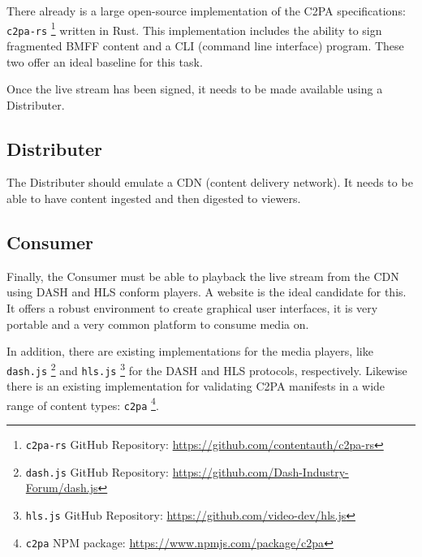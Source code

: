 There already is a large open-source implementation of the C2PA specifications: \texttt{c2pa-rs} \footnote{\texttt{c2pa-rs} GitHub Repository: \url{https://github.com/contentauth/c2pa-rs}} written in Rust. This implementation includes the ability to sign fragmented BMFF content and a CLI (command line interface) program. These two offer an ideal baseline for this task.

Once the live stream has been signed, it needs to be made available using a Distributer.

\subsection{Distributer}

The Distributer should emulate a CDN (content delivery network). It needs to be able to have content ingested and then digested to viewers.

\subsection{Consumer}

Finally, the Consumer must be able to playback the live stream from the CDN using DASH and HLS conform players. A website is the ideal candidate for this. It offers a robust environment to create graphical user interfaces, it is very portable and a very common platform to consume media on.

In addition, there are existing implementations for the media players, like \texttt{dash.js} \footnote{\texttt{dash.js} GitHub Repository: \url{https://github.com/Dash-Industry-Forum/dash.js}} and \texttt{hls.js} \footnote{\texttt{hls.js} GitHub Repository: \url{https://github.com/video-dev/hls.js}} for the DASH and HLS protocols, respectively. Likewise there is an existing implementation for validating C2PA manifests in a wide range of content types: \texttt{c2pa} \footnote{\texttt{c2pa} NPM package: \url{https://www.npmjs.com/package/c2pa}}.